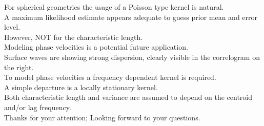 \documentclass[aspectratio=169, t, 10pt,
    ignorenonframetext,
    ]{beamer}
\begin{document}
For spherical geometries the usage of a Poisson type kernel is natural.
\\
A maximum likelihood estimate appears adequate to guess prior mean and error level.
\\
However, NOT for the characteristic length.
\\[2mm]

Modeling phase velocities is a potential future application.
\\
Surface waves are showing strong dispersion, clearly visible in the correlogram on the right.
\\
To model phase velocities a frequency dependent kernel is required.
\\
A simple departure is a locally stationary kernel.
\\
Both characteristic length and variance are assumed to depend on the centroid and/or lag frequency.
\\[2mm]

Thanks for your attention; Looking forward to your questions.
\end{document}
